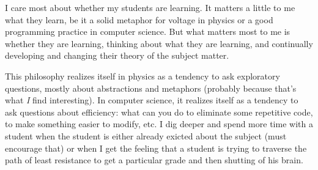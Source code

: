 \documentclass[12pt]{article}
\begin{document}

\vspace{4ex}

I care most about whether my students are learning.   It matters a
little to me what they learn, be it a solid metaphor for voltage in
physics or a good programming practice in computer science.  But what
matters most to me is whether they are learning, thinking about what
they are learning, and continually developing and changing their theory
of the subject matter.

This philosophy realizes itself in physics as a tendency to ask
exploratory questions, mostly about abstractions and metaphors (probably
because that's what \textit{I} find interesting).  In computer science,
it realizes itself as a tendency to ask questions about efficiency: what
can you do to eliminate some repetitive code, to make something easier
to modify, etc.  I dig deeper and spend more time with a student when
the student is either already exicted about the subject (must encourage
that) or when I get the feeling that a student is trying to traverse the
path of least resistance to get a particular grade and then shutting of
his brain.
\end{document}
